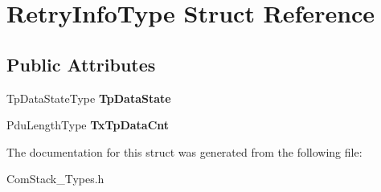 \hypertarget{structRetryInfoType}{}\section{Retry\+Info\+Type Struct Reference}
\label{structRetryInfoType}
\subsection*{Public Attributes}
\begin{DoxyCompactItemize}
\item 
Tp\+Data\+State\+Type {\bfseries Tp\+Data\+State}\hypertarget{structRetryInfoType_a4e8628d1369bcf3ea28b59117f2243ee}{}\label{structRetryInfoType_a4e8628d1369bcf3ea28b59117f2243ee}

\item 
Pdu\+Length\+Type {\bfseries Tx\+Tp\+Data\+Cnt}\hypertarget{structRetryInfoType_acdcd10b88fe8c2b1c5bdab4abb2e4b08}{}\label{structRetryInfoType_acdcd10b88fe8c2b1c5bdab4abb2e4b08}

\end{DoxyCompactItemize}


The documentation for this struct was generated from the following file\+:\begin{DoxyCompactItemize}
\item 
Com\+Stack\+\_\+\+Types.\+h\end{DoxyCompactItemize}
